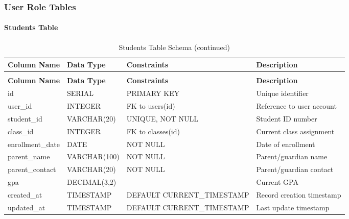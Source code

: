 \documentclass[12pt,a4paper]{report}
\begin{document}
\subsubsection{User Role Tables}

\paragraph{Students Table}
\begin{longtable}{|p{3cm}|p{3cm}|p{2cm}|p{6cm}|}
\caption{Students Table Schema}
\label{tab:students}\\
\hline
\textbf{Column Name} & \textbf{Data Type} & \textbf{Constraints} & \textbf{Description} \\
\hline
\endfirsthead
\caption[]{Students Table Schema (continued)}\\
\hline
\textbf{Column Name} & \textbf{Data Type} & \textbf{Constraints} & \textbf{Description} \\
\hline
\endhead
id & SERIAL & PRIMARY KEY & Unique identifier \\
\hline
user\_id & INTEGER & FK to users(id) & Reference to user account \\
\hline
student\_id & VARCHAR(20) & UNIQUE, NOT NULL & Student ID number \\
\hline
class\_id & INTEGER & FK to classes(id) & Current class assignment \\
\hline
enrollment\_date & DATE & NOT NULL & Date of enrollment \\
\hline
parent\_name & VARCHAR(100) & NOT NULL & Parent/guardian name \\
\hline
parent\_contact & VARCHAR(20) & NOT NULL & Parent/guardian contact \\
\hline
gpa & DECIMAL(3,2) & & Current GPA \\
\hline
created\_at & TIMESTAMP & DEFAULT CURRENT\_TIMESTAMP & Record creation timestamp \\
\hline
updated\_at & TIMESTAMP & DEFAULT CURRENT\_TIMESTAMP & Last update timestamp \\
\hline
\end{longtable}
\end{document}
